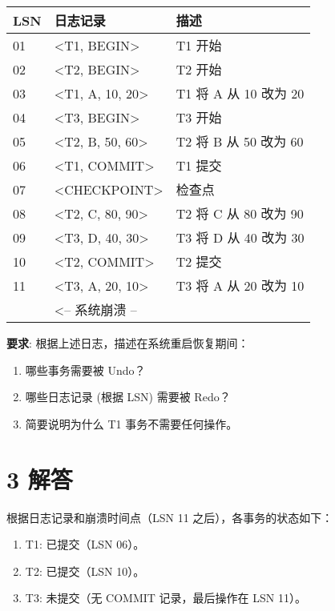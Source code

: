 \documentclass{article}
\begin{document}
	\begin{table}[!ht]
		\centering
		\begin{tabular}{|l|l|l|}
			\hline
			LSN & 日志记录 & 描述  \\ \hline
			01 & <T1, BEGIN> & T1 开始  \\ \hline
			02 & <T2, BEGIN> & T2 开始  \\ \hline
			03 & <T1, A, 10, 20> & T1 将 A 从 10 改为 20  \\ \hline
			04 & <T3, BEGIN> & T3 开始  \\ \hline
			05 & <T2, B, 50, 60> & T2 将 B 从 50 改为 60  \\ \hline
			06 & <T1, COMMIT> & T1 提交  \\ \hline
			07 & <CHECKPOINT> & 检查点  \\ \hline
			08 & <T2, C, 80, 90> & T2 将 C 从 80 改为 90  \\ \hline
			09 & <T3, D, 40, 30> & T3 将 D 从 40 改为 30  \\ \hline
			10 & <T2, COMMIT> & T2 提交  \\ \hline
			11 & <T3, A, 20, 10> & T3 将 A 从 20 改为 10  \\ \hline
			~ & <-- 系统崩溃 -- &   \\ \hline
		\end{tabular}
	\end{table}
	
	\textbf{要求}: 根据上述日志，描述在系统重启恢复期间：
	
	\begin{enumerate}[noitemsep, label={{\arabic*})}]
		\item 哪些事务需要被 Undo？
		\item 哪些日志记录 (根据 LSN) 需要被 Redo？
		\item 简要说明为什么 T1 事务不需要任何操作。
	\end{enumerate}\textbf{}
	
	\section*{3 解答}
	
	根据日志记录和崩溃时间点（LSN 11 之后），各事务的状态如下：
	
	\begin{enumerate}[noitemsep, label={{\arabic*})}]
		\item T1: 已提交（LSN 06）。
		\item T2: 已提交（LSN 10）。
		\item T3: 未提交（无 COMMIT 记录，最后操作在 LSN 11）。
	\end{enumerate}\textbf{}
	
\end{document}
